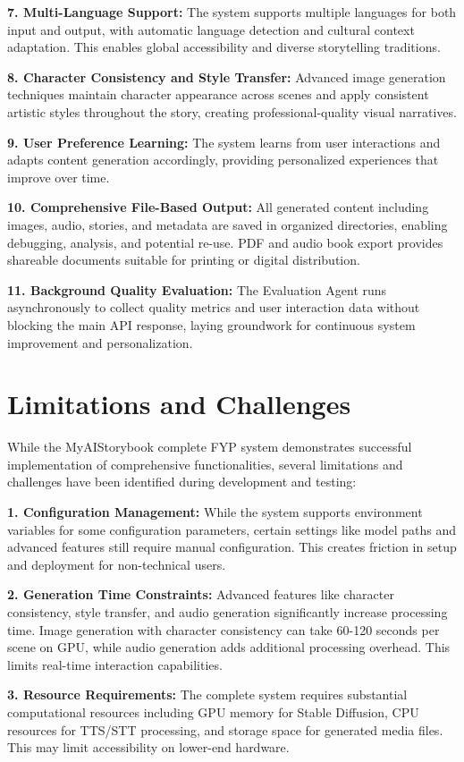 \textbf{7. Multi-Language Support:} The system supports multiple languages for both input and output, with automatic language detection and cultural context adaptation. This enables global accessibility and diverse storytelling traditions.

\textbf{8. Character Consistency and Style Transfer:} Advanced image generation techniques maintain character appearance across scenes and apply consistent artistic styles throughout the story, creating professional-quality visual narratives.

\textbf{9. User Preference Learning:} The system learns from user interactions and adapts content generation accordingly, providing personalized experiences that improve over time.

\textbf{10. Comprehensive File-Based Output:} All generated content including images, audio, stories, and metadata are saved in organized directories, enabling debugging, analysis, and potential re-use. PDF and audio book export provides shareable documents suitable for printing or digital distribution.

\textbf{11. Background Quality Evaluation:} The Evaluation Agent runs asynchronously to collect quality metrics and user interaction data without blocking the main API response, laying groundwork for continuous system improvement and personalization.

\section{Limitations and Challenges}
While the MyAIStorybook complete FYP system demonstrates successful implementation of comprehensive functionalities, several limitations and challenges have been identified during development and testing:

\textbf{1. Configuration Management:} While the system supports environment variables for some configuration parameters, certain settings like model paths and advanced features still require manual configuration. This creates friction in setup and deployment for non-technical users.

\textbf{2. Generation Time Constraints:} Advanced features like character consistency, style transfer, and audio generation significantly increase processing time. Image generation with character consistency can take 60-120 seconds per scene on GPU, while audio generation adds additional processing overhead. This limits real-time interaction capabilities.

\textbf{3. Resource Requirements:} The complete system requires substantial computational resources including GPU memory for Stable Diffusion, CPU resources for TTS/STT processing, and storage space for generated media files. This may limit accessibility on lower-end hardware.

